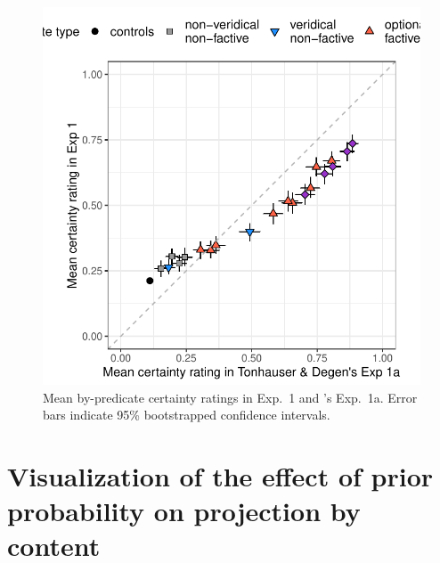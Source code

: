 \documentclass[11pt,fleqn]{article}
\newcommand{\6}{\mbox{$[\hspace*{-.6mm}[$}}
\newcommand{\9}{\mbox{$]\hspace*{-.6mm}]$}}
\newcommand{\citepos}[1]{\citeauthor{#1}'s \citeyear{#1}}
\begin{document}
\begin{figure}[H]
\centering

\includegraphics[width=.4\paperwidth]{../../results/exp4/graphs/projection-comparison}

\caption{Mean by-predicate certainty ratings in Exp.~1 and \citepos{tonhauser-degen-factive} Exp.~1a. Error bars indicate 95\% bootstrapped confidence intervals.} 
\label{f-projection-comparison}
\end{figure}

\section{Visualization of the effect of prior probability on projection by content}
\end{document}
